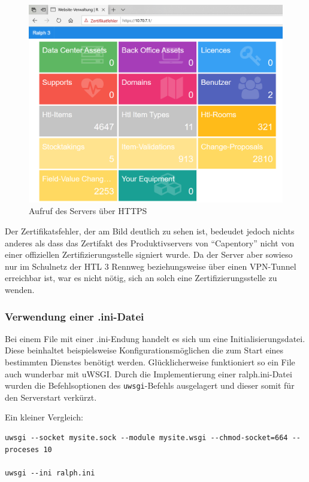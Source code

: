 \begin{figure}[ht]
\centering
\includegraphics{https.png}
\caption{Aufruf des Servers über HTTPS}
\end{figure}

Der Zertifikatsfehler, der am Bild deutlich zu sehen ist, bedeudet
jedoch nichts anderes als dass das Zertifakt des Produktivservers von
``Capentory'' nicht von einer offiziellen Zertifizierungsstelle signiert
wurde. Da der Server aber sowieso nur im Schulnetz der HTL 3 Rennweg
beziehungsweise über einen VPN-Tunnel erreichbar ist, war es nicht
nötig, sich an solch eine Zertifizierungsstelle zu wenden.

\hypertarget{verwendung-einer-.ini-datei}{%
\subsubsection{Verwendung einer
.ini-Datei}\label{verwendung-einer-.ini-datei}}

Bei einem File mit einer .ini-Endung handelt es sich um eine
Initialisierungsdatei. Diese beinhaltet beispielsweise
Konfigurationsmöglichen die zum Start eines bestimmten Dienstes benötigt
werden. Glücklicherweise funktioniert so ein File auch wunderbar mit
uWSGI. Durch die Implementierung einer ralph.ini-Datei wurden die
Befehlsoptionen des \texttt{uwsgi}-Befehls ausgelagert und dieser somit
für den Serverstart verkürzt.

Ein kleiner Vergleich:

\begin{verbatim}
uwsgi --socket mysite.sock --module mysite.wsgi --chmod-socket=664 --proceses 10

uwsgi --ini ralph.ini
\end{verbatim}

